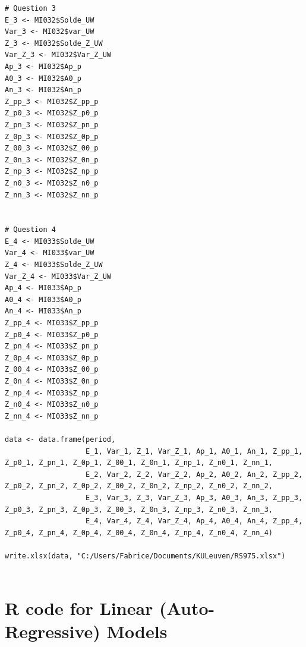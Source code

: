 \documentclass[12pt,a4paper,oneside]{book}
\begin{document}
\begin{lstlisting}
# Question 3
E_3 <- MI032$Solde_UW
Var_3 <- MI032$var_UW
Z_3 <- MI032$Solde_Z_UW
Var_Z_3 <- MI032$Var_Z_UW
Ap_3 <- MI032$Ap_p
A0_3 <- MI032$A0_p
An_3 <- MI032$An_p
Z_pp_3 <- MI032$Z_pp_p
Z_p0_3 <- MI032$Z_p0_p
Z_pn_3 <- MI032$Z_pn_p
Z_0p_3 <- MI032$Z_0p_p
Z_00_3 <- MI032$Z_00_p
Z_0n_3 <- MI032$Z_0n_p
Z_np_3 <- MI032$Z_np_p
Z_n0_3 <- MI032$Z_n0_p
Z_nn_3 <- MI032$Z_nn_p    


# Question 4
E_4 <- MI033$Solde_UW
Var_4 <- MI033$var_UW
Z_4 <- MI033$Solde_Z_UW
Var_Z_4 <- MI033$Var_Z_UW
Ap_4 <- MI033$Ap_p
A0_4 <- MI033$A0_p
An_4 <- MI033$An_p
Z_pp_4 <- MI033$Z_pp_p
Z_p0_4 <- MI033$Z_p0_p
Z_pn_4 <- MI033$Z_pn_p
Z_0p_4 <- MI033$Z_0p_p
Z_00_4 <- MI033$Z_00_p
Z_0n_4 <- MI033$Z_0n_p
Z_np_4 <- MI033$Z_np_p
Z_n0_4 <- MI033$Z_n0_p
Z_nn_4 <- MI033$Z_nn_p    

data <- data.frame(period, 
                   E_1, Var_1, Z_1, Var_Z_1, Ap_1, A0_1, An_1, Z_pp_1, Z_p0_1, Z_pn_1, Z_0p_1, Z_00_1, Z_0n_1, Z_np_1, Z_n0_1, Z_nn_1,
                   E_2, Var_2, Z_2, Var_Z_2, Ap_2, A0_2, An_2, Z_pp_2, Z_p0_2, Z_pn_2, Z_0p_2, Z_00_2, Z_0n_2, Z_np_2, Z_n0_2, Z_nn_2,
                   E_3, Var_3, Z_3, Var_Z_3, Ap_3, A0_3, An_3, Z_pp_3, Z_p0_3, Z_pn_3, Z_0p_3, Z_00_3, Z_0n_3, Z_np_3, Z_n0_3, Z_nn_3,
                   E_4, Var_4, Z_4, Var_Z_4, Ap_4, A0_4, An_4, Z_pp_4, Z_p0_4, Z_pn_4, Z_0p_4, Z_00_4, Z_0n_4, Z_np_4, Z_n0_4, Z_nn_4)

write.xlsx(data, "C:/Users/Fabrice/Documents/KULeuven/RS975.xlsx") 


\end{lstlisting}

\newpage
\section*{R code for Linear (Auto-Regressive) Models}
\end{document}
